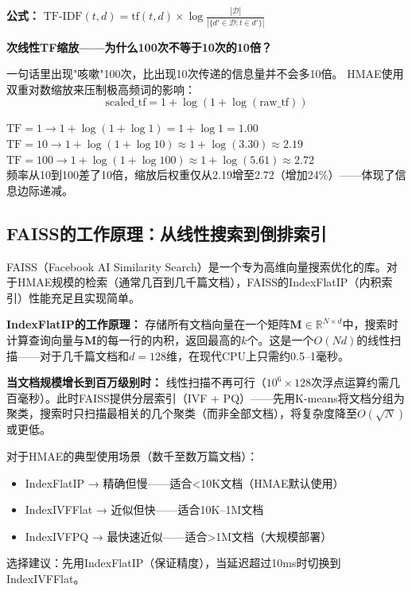 \documentclass[11pt,a4paper]{ctexart}
\begin{document}
\textbf{公式：} $\text{TF-IDF}(t, d) = \text{tf}(t, d) \times \log\frac{|\mathcal{D}|}{|\{d' \in \mathcal{D}: t \in d'\}|}$

\textbf{次线性TF缩放——为什么100次不等于10次的10倍？}

一句话里出现"咳嗽"100次，比出现10次传递的信息量并不会多10倍。
HMAE使用双重对数缩放来压制极高频词的影响：
$$\text{scaled\_tf} = 1 + \log(1 + \log(\text{raw\_tf}))$$

\begin{exambox}[次线性缩放的数值例子]
$\text{TF}=1 \to 1+\log(1+\log 1)=1+\log 1=1.00$\\
$\text{TF}=10 \to 1+\log(1+\log 10) \approx 1+\log(3.30) \approx 2.19$\\
$\text{TF}=100 \to 1+\log(1+\log 100) \approx 1+\log(5.61) \approx 2.72$\\
频率从10到100差了10倍，缩放后权重仅从2.19增至2.72（增加24\%）——体现了信息边际递减。
\end{exambox}


\subsection{FAISS的工作原理：从线性搜索到倒排索引}

FAISS（Facebook AI Similarity Search）是一个专为高维向量搜索优化的库。对于HMAE规模的检索（通常几百到几千篇文档），FAISS的IndexFlatIP（内积索引）性能充足且实现简单。

\textbf{IndexFlatIP的工作原理：} 存储所有文档向量在一个矩阵$\mathbf{M} \in \mathbb{R}^{N \times d}$中，搜索时计算查询向量与$\mathbf{M}$的每一行的内积，返回最高的$k$个。这是一个$O(Nd)$的线性扫描——对于几千篇文档和$d=128$维，在现代CPU上只需约0.5--1毫秒。

\textbf{当文档规模增长到百万级别时：} 线性扫描不再可行（$10^6 \times 128$次浮点运算约需几百毫秒）。此时FAISS提供分层索引（IVF + PQ）——先用K-means将文档分组为聚类，搜索时只扫描最相关的几个聚类（而非全部文档），将复杂度降至$O(\sqrt{N})$或更低。

\begin{exambox}[FAISS索引选择的实验建议]
对于HMAE的典型使用场景（数千至数万篇文档）：
\begin{itemize}[nosep]
\item IndexFlatIP → 精确但慢——适合<10K文档（HMAE默认使用）
\item IndexIVFFlat → 近似但快——适合10K--1M文档
\item IndexIVFPQ → 最快速近似——适合>1M文档（大规模部署）
\end{itemize}
选择建议：先用IndexFlatIP（保证精度），当延迟超过10ms时切换到IndexIVFFlat。
\end{exambox}
\end{document}
